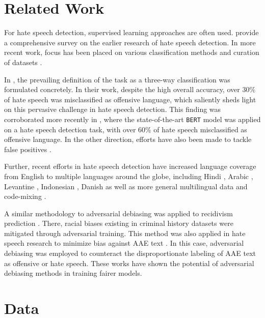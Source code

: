 \documentclass[11pt]{article}
\begin{document}
	
	\section{Related Work}
	
	For hate speech detection, supervised learning approaches are often used. \citet{schmidt2017survey} provide a comprehensive survey on the earlier research of hate speech detection. In more recent work, focus has been placed on various classification methods and curation of datasets \cite{davidson,wulczyn2017ex,zhang2018detecting,mozafari2019bert,qian-etal-2021-lifelong}. 
	
	In \citet{davidson}, the prevailing definition of the task as a three-way classification was formulated concretely. In their work, despite the high overall accuracy, over 30\% of hate speech was misclassified as offensive language, which saliently sheds light on this pervasive challenge in hate speech detection. This finding was corroborated more recently in \citet{mozafari2019bert}, where the state-of-the-art \texttt{BERT} model \cite{devlin2019bert} was applied on a hate speech detection task, with over 60\% of hate speech misclassified as offensive language. In the other direction, efforts have also been made to tackle false positives \cite{markov-daelemans-2021-improving}.
	
	Further, recent efforts in hate speech detection have increased language coverage from English to multiple languages around the globe, including Hindi \cite{mathur-etal-2018-offend}, Arabic \cite{mubarak-etal-2017-abusive}, Levantine \cite{mulki-etal-2019-l}, Indonesian \cite{ibrohim-budi-2019-multi}, Danish \cite{sigurbergsson-derczynski-2020-offensive} as well as more general multilingual data \cite{multi_hate_speech,hatespeech_crosslingual_embds,basile-etal-2019-semeval} and code-mixing \cite{bohra-etal-2018-dataset}.
	
	A similar methodology to adversarial debiasing was applied to recidivism prediction \cite{wadsworth2018achieving}. There, racial biases existing in criminal history datasets were mitigated through adversarial training. This method was also applied in hate speech research to minimize bias against AAE text \cite{adversarial_training_aae_hatespeech}. In this case, adversarial debiasing was employed to counteract the disproportionate labeling of AAE text as offensive or hate speech. These works have shown the potential of adversarial debiasing methods in training fairer models.
	
	
	\section{Data}
	
\end{document}
